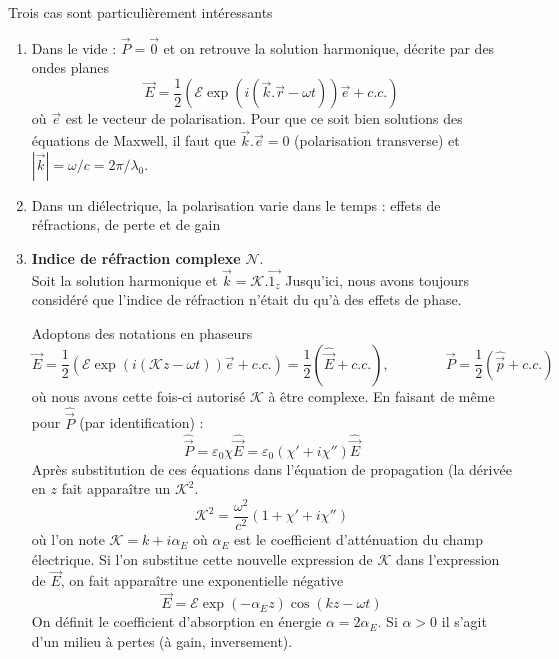 	Trois cas sont particulièrement intéressants
	\begin{enumerate}
	\item	Dans le vide : $\vec{P}=\vec{0}$ et on retrouve la solution harmonique, décrite par des ondes planes
	\begin{equation}
	\vec{E} = \frac{1}{2}(\mathcal{E}\exp(i(\vec{k}.\vec{r}-\omega t))\vec{e} + c.c.)
	\end{equation}
	où $\vec{e}$ est le vecteur de polarisation. Pour que ce soit bien solutions des équations de Maxwell, il 
	faut que $\vec{k}.\vec{e} = 0$ (polarisation transverse) et $|\vec{k}| = \omega/c=2\pi/\lambda_0$.\\
	\item Dans un diélectrique, la polarisation varie dans le temps : effets de réfractions, de perte et de gain
	\item \textbf{Indice de réfraction complexe} $\mathcal{N}$.\\
	Soit la solution harmonique et $\vec{k}=\mathcal{K}.\vec{1_z}$
	Jusqu'ici, nous avons toujours considéré que l'indice de réfraction n'était du qu'à des effets de phase.

	Adoptons des notations en phaseurs
	\begin{equation}
	\vec{E} =\frac{1}{2}(\mathcal{E}\exp(i(\mathcal{K}z-\omega t))\vec{e} + c.c.)= \frac{1}{2}(\hat{\vec{E}}+c.c.),\qquad\qquad\vec{P} = \frac{1}{2}(\hat{\vec{p}}+c.c.)
	\end{equation}
	où nous avons cette fois-ci autorisé $\mathcal{K}$ à être complexe. En faisant de même pour $\hat{\vec{P}}$ 
	(par identification) :
	\begin{equation}
	\hat{\vec{P}} = \varepsilon_0\chi\hat{\vec{E}} = \varepsilon_0(\chi'+i\chi'')\hat{\vec{E}}
	\end{equation}
	Après substitution de ces équations dans l'équation de propagation (la dérivée en $z$ fait apparaître un 
	$\mathcal{K}^2$.
	\begin{equation}
	\mathcal{K}^2 = \dfrac{\omega^2}{c^2}(1+\chi'+i\chi'')
	\end{equation}
	où l'on note $\mathcal{K}=k+i\alpha_E$ où $\alpha_E$ est le coefficient d'atténuation du champ électrique. Si 
	l'on substitue cette nouvelle expression de $\mathcal{K}$ dans l'expression de $\vec{E}$, on fait apparaître 
	une exponentielle négative
	\begin{equation}
	\vec{E}=\mathcal{E}\exp(-\alpha_Ez)\cos(kz-\omega t)
	\end{equation}
	On définit le coefficient d'absorption en énergie $\alpha=2\alpha_E$. Si $\alpha>0$ il s'agit d'un milieu à
	 pertes (à gain, inversement).\\
	 

\end{enumerate}
